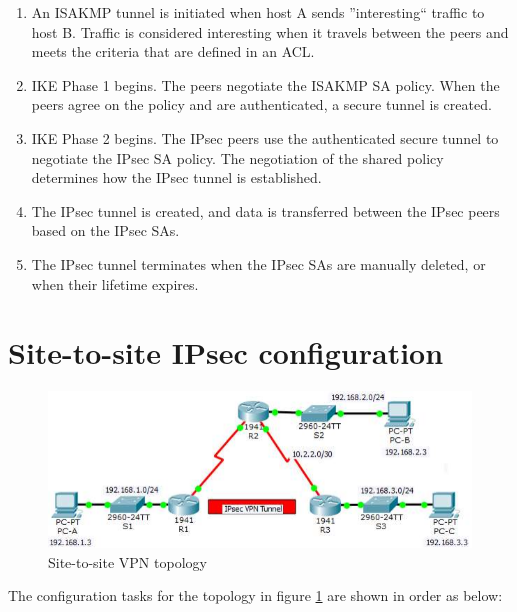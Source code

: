 \begin{enumerate}
\item An ISAKMP tunnel is initiated when host A sends ''interesting`` traffic to host B. Traffic is considered interesting when it travels between the peers and meets the criteria that are defined in an ACL.

\item IKE Phase 1 begins. The peers negotiate the ISAKMP SA policy. When the peers agree on the policy and are authenticated, a secure tunnel is created.

\item IKE Phase 2 begins. The IPsec peers use the authenticated secure tunnel to negotiate the IPsec SA policy. The negotiation of the shared policy determines how the IPsec tunnel is established.

\item The IPsec tunnel is created, and data is transferred between the IPsec peers based on the IPsec SAs.

\item The IPsec tunnel terminates when the IPsec SAs are manually deleted, or when their lifetime expires.
\end{enumerate}

\section{Site-to-site IPsec configuration}

\begin{figure}[hbtp]
\caption{Site-to-site VPN topology}\label{VPNtopolgy}
\centering
\includegraphics[scale=1]{pictures/VPNtopolgy.PNG}
\end{figure}

The configuration tasks for the topology in figure \ref{VPNtopolgy} are shown in order as below:


